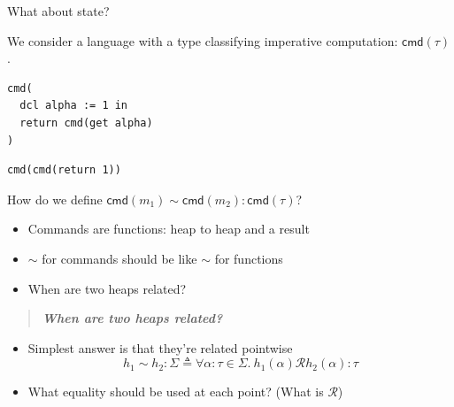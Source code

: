 \documentclass{beamer}
\newcommand{\relR}{\ensuremath{\mathrel{\mathcal{R}}}}
\newcommand{\defs}{\ensuremath{\mathrel{\triangleq}}}
\newcommand{\cmd}[1]{\ensuremath{\mathsf{cmd}(#1)}}
\begin{document}
\begin{frame}
  \centering
  What about state?

  \bigskip

  We consider a language with a type classifying imperative
  computation: $\cmd{\tau}$.
\end{frame}

\begin{frame}[fragile]
  \centering
  \begin{minipage}{0.5\textwidth}
    \centering
\begin{lstlisting}
cmd(
  dcl alpha := 1 in
  return cmd(get alpha)
)
\end{lstlisting}
  \end{minipage}%
  \begin{minipage}{0.5\textwidth}
    \centering
\begin{lstlisting}
cmd(cmd(return 1))
\end{lstlisting}
  \end{minipage}
\end{frame}

\begin{frame}
  \centering
  How do we define $\cmd{m_1} \sim \cmd{m_2} : \cmd{\tau}$?
  \pause
  \bigskip
  \begin{itemize}
  \item Commands are functions: heap to heap and a result
  \item $\sim$ for commands should be like $\sim$ for functions
  \item When are two heaps related?
  \end{itemize}
\end{frame}

\begin{frame}
  \begin{quote}\centering
    \bf\it When are two heaps related?
  \end{quote}

  \begin{itemize}
  \item Simplest answer is that they're related pointwise\\
    \[
      h_1 \sim h_2 : \Sigma \defs
      \forall \alpha : \tau \in \Sigma.\ h_1(\alpha) \relR h_2(\alpha) : \tau
    \]
  \item What equality should be used at each point? (What is $\relR$)
  \end{itemize}
\end{frame}
\end{document}
